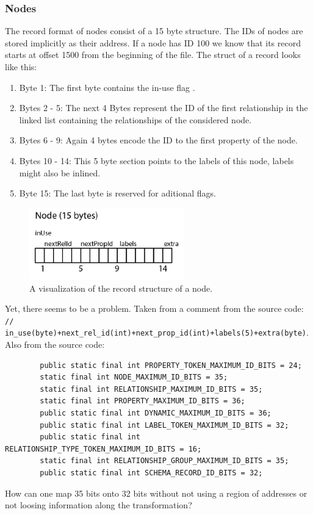 \documentclass[a4paper,10pt]{article}
\begin{document}
    \subsubsection{Nodes}
    The record format of nodes consist of a 15 byte structure. The IDs of nodes are stored implicitly as their address. If a node has ID 100 we know that its record starts at offset 1500 from the beginning of the file. The struct of a record looks like this:
    \begin{enumerate}
     \item Byte 1: The first byte contains the in-use flag .
     \item Bytes 2 - 5: The next 4 Bytes represent the ID of the first relationship in the linked list containing the relationships of the considered node.
     \item Bytes 6 - 9: Again 4 bytes encode the ID to the first property of the node.
     \item Bytes 10 - 14: This 5 byte section points to the labels of this node, labels might also be inlined.
     \item Byte 15: The last byte is reserved for aditional flags.
    \end{enumerate}
    \begin{figure}[htp]\label{node_layout}
    \begin{center}
    \includegraphics[keepaspectratio,width=0.6\textwidth]{img/node_layout.png}
    \end{center}
    \caption{A visualization of the record structure of a node.} %
    \end{figure}
    
    Yet, there seems to be a problem.
    Taken from a comment from the source code: \\
    \texttt{// in_use(byte)+next_rel_id(int)+next_prop_id(int)+labels(5)+extra(byte)}. \\
    Also from the source code:
     \begin{verbatim}
        public static final int PROPERTY_TOKEN_MAXIMUM_ID_BITS = 24;
        static final int NODE_MAXIMUM_ID_BITS = 35;
        static final int RELATIONSHIP_MAXIMUM_ID_BITS = 35;
        static final int PROPERTY_MAXIMUM_ID_BITS = 36;
        public static final int DYNAMIC_MAXIMUM_ID_BITS = 36;
        public static final int LABEL_TOKEN_MAXIMUM_ID_BITS = 32;
        public static final int RELATIONSHIP_TYPE_TOKEN_MAXIMUM_ID_BITS = 16;
        static final int RELATIONSHIP_GROUP_MAXIMUM_ID_BITS = 35;
        public static final int SCHEMA_RECORD_ID_BITS = 32;
     \end{verbatim}
     How can one map 35 bits onto 32 bits without not using a region of addresses or not loosing information along the transformation?
     
\end{document}
